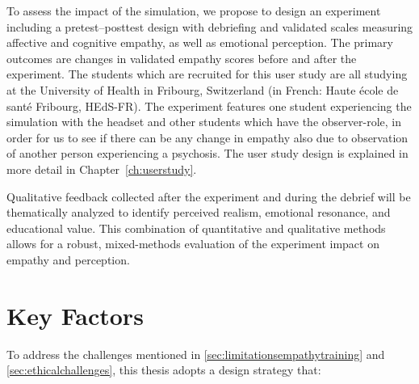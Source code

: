 To assess the impact of the simulation, we propose to design an experiment including a pretest–posttest design with debriefing and validated scales measuring affective and cognitive empathy, as well as emotional perception. The primary outcomes are changes in validated empathy scores before and after the experiment. The students which are recruited for this user study are all studying at the University of Health in Fribourg, Switzerland (in French: Haute école de santé Fribourg, HEdS-FR). The experiment features one student experiencing the simulation with the headset and other students which have the observer-role, in order for us to see if there can be any change in empathy also due to observation of another person experiencing a psychosis. The user study design is explained in more detail in Chapter~\ref{ch:userstudy}.

\vspace{1em}

Qualitative feedback collected after the experiment and during the debrief will be thematically analyzed to identify perceived realism, emotional resonance, and educational value. This combination of quantitative and qualitative methods allows for a robust, mixed-methods evaluation of the experiment impact on empathy and perception.

\vspace{1em}

\section{Key Factors}
To address the challenges mentioned in \ref{sec:limitationsempathytraining} and \ref{sec:ethicalchallenges}, this thesis adopts a design strategy that:

